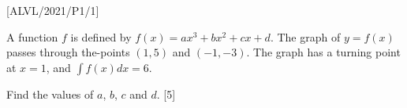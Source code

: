 \item {[}ALVL/2021/P1/1{]}

A function $f$ is defined by $f(x)=ax^{3}+bx^{2}+cx+d$. The graph
of $y=f(x)$ passes through the-points $\left(1,5\right)$ and $(-1,-3)$.
The graph has a turning point at $x=1$, and $\int f(x)dx=6$. 

Find the values of $a$, $b$, $c$ and $d$. \hfill{}{[}5{]}
